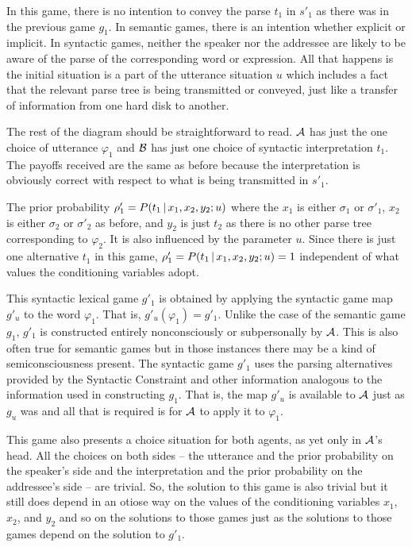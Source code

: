 In this game, there is no intention to convey the parse $t_1$ in $s'_1$ as there was in the previous game $g_1$. In semantic games, there is an intention whether explicit or implicit. In syntactic games, neither the speaker nor the addressee are likely to be aware of the parse of the corresponding word or expression. All that happens is the initial situation is a part of the utterance situation $u$ which includes a fact that the relevant parse tree is being transmitted or conveyed, just like a transfer of information from one hard disk to another.

The rest of the diagram should be straightforward to read. $\cal A$ has just the one choice of utterance $\varphi_1$ and $\cal B$ has just one choice of syntactic interpretation $t_1$. The payoffs received are the same as before because the interpretation is obviously correct with respect to what is being transmitted in $s'_1$.

The prior probability $\rho'_1 = P(t_1 \,|\, x_1, x_2, y_2; u)$ where the $x_1$ is either $\sigma_1$ or $\sigma'_1$, $x_2$ is either $\sigma_2$ or $\sigma'_2$ as before, and $y_2$ is just $t_2$ as there is no other parse tree corresponding to $\varphi_2$. It is also influenced by the parameter $u$. Since there is just one alternative $t_1$ in this game, $\rho'_1 = P(t_1 \,|\, x_1, x_2, y_2; u) = 1$ independent of what values the conditioning variables adopt.

This syntactic lexical game $g'_1$ is obtained by applying the syntactic game map $g'_u$ to the word $\varphi_1$. That is, $g'_u(\varphi_1) = g'_1$. Unlike the case of the semantic game $g_1$, $g'_1$ is constructed entirely nonconsciously or subpersonally by $\cal A$. This is also often true for semantic games but in those instances there may be a kind of semiconsciousness present. The syntactic game $g'_1$ uses the parsing alternatives provided by the Syntactic Constraint and other information analogous to the information used in constructing $g_1$. That is, the map $g'_u$ is available to $\cal A$ just as $g_u$ was and all that is required is for $\cal A$ to apply it to $\varphi_1$.

This game also presents a choice situation for both agents, as yet only in $\cal A$'s head. All the choices on both sides -- the utterance and the prior probability on the speaker's side and the interpretation and the prior probability on the addressee's side -- are trivial. So, the solution to this game is also trivial but it still does depend in an otiose way on the values of the conditioning variables $x_1$, $x_2$, and $y_2$ and so on the solutions to those games just as the solutions to those games depend on the solution to $g'_1$.

